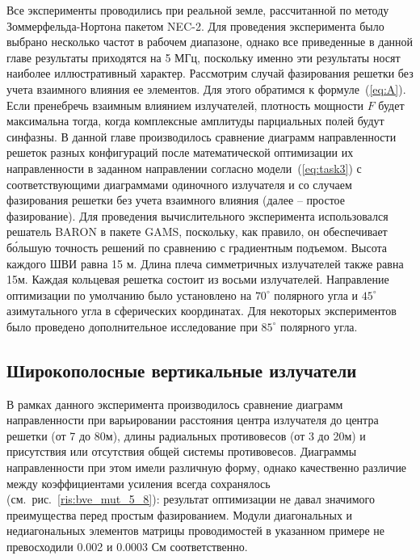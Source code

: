 Все эксперименты проводились при реальной земле, рассчитанной по методу Зоммерфельда-Нортона пакетом NEC-2. Для проведения эксперимента было выбрано несколько частот в рабочем диапазоне, однако все приведенные в данной главе результаты приходятся на 5 МГц, поскольку именно эти результаты носят наиболее иллюстративный характер.
Рассмотрим случай фазирования решетки без учета взаимного влияния ее элементов. Для этого обратимся к формуле~(\ref{eq:A}). Если пренебречь взаимным влиянием излучателей, плотность мощности $F$ будет максимальна тогда, когда комплексные амплитуды парциальных полей будут синфазны. В данной главе производилось сравнение диаграмм направленности решеток разных конфигураций после математической оптимизации их направленности в заданном направлении согласно модели~(\ref{eq:task3}) с соответствующими диаграммами одиночного излучателя и со случаем фазирования решетки без учета взаимного влияния (далее – простое фазирование).
Для проведения вычислительного эксперимента использовался решатель BARON в пакете GAMS, поскольку, как правило, он обеспечивает бо́льшую точность решений по сравнению с градиентным подъемом. Высота каждого ШВИ равна 15 м. Длина плеча симметричных излучателей также равна 15м.
Каждая кольцевая решетка состоит из восьми излучателей. Направление оптимизации по умолчанию было установлено на $70^{\circ}$ полярного угла и $45^\circ$ азимутального угла в сферических координатах. Для некоторых экспериментов было проведено дополнительное исследование при $85^\circ$ полярного угла.


\subsection{Широкополосные вертикальные излучатели}
В рамках данного эксперимента производилось сравнение диаграмм направленности при варьировании расстояния центра излучателя до центра решетки (от 7 до 80м), длины радиальных противовесов (от 3 до 20м) и присутствия или отсутствия общей системы противовесов. Диаграммы направленности при этом имели различную форму, однако качественно различие между коэффициентами усиления всегда сохранялось (см.~рис.~\ref{ris:bve_mut_5_8}): результат оптимизации не давал значимого преимущества перед простым фазированием.  Модули диагональных и недиагональных элементов матрицы проводимостей в указанном примере не превосходили 0.002 и 0.0003 См соответственно.

